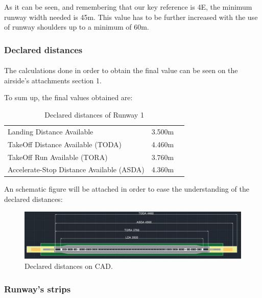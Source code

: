 			As it can be seen, and remembering that our key reference is 4E, the minimum runway width needed is 45m. This value has to be further increased with the use of runway shoulders up to a minimum of 60m. 

			\subsubsection{Declared distances}
			\paragraph{} The calculations done in order to obtain the final value can be seen on the airside’s attachments section 1. 
			
			To sum up, the final values obtained are:
			
			\begin{table}[htb]
				\centering
				\begin{tabular}{ll p{5cm}}
					\midrule[2pt]
					Landing Distance Available & 3.500m\\
					TakeOff Distance Available (TODA) & 4.460m\\
					TakeOff Run Available (TORA)& 3.760m \\
					Accelerate-Stop Distance Available (ASDA)& 4.360m\\
					\bottomrule[2pt]
				\end{tabular}
				\caption{Declared distances of  Runway 1}
				\label{DeclareddistancesRW1}
			\end{table}
			
			An schematic figure will be attached in order to ease the understanding of the declared distances:
			
			\begin{figure}[H]
				\centering
				\includegraphics[clip, trim=0cm 0cm 0cm 0cm, width=1\textwidth]{./images/declareddistances/pista}
				\caption{Declared distances on CAD.} %
				\label{} %
			\end{figure}
			
			\subsubsection{Runway's strips}
